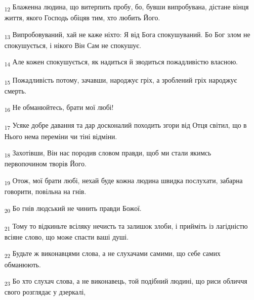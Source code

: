 \begin{tcolorbox}
\textsubscript{12} Блаженна людина, що витерпить пробу, бо, бувши випробувана, дістане вінця життя, якого Господь обіцяв тим, хто любить Його.
\end{tcolorbox}
\begin{tcolorbox}
\textsubscript{13} Випробовуваний, хай не каже ніхто: Я від Бога спокушуваний. Бо Бог злом не спокушується, і нікого Він Сам не спокушує.
\end{tcolorbox}
\begin{tcolorbox}
\textsubscript{14} Але кожен спокушується, як надиться й зводиться пожадливістю власною.
\end{tcolorbox}
\begin{tcolorbox}
\textsubscript{15} Пожадливість потому, зачавши, народжує гріх, а зроблений гріх народжує смерть.
\end{tcolorbox}
\begin{tcolorbox}
\textsubscript{16} Не обманюйтесь, брати мої любі!
\end{tcolorbox}
\begin{tcolorbox}
\textsubscript{17} Усяке добре давання та дар досконалий походить згори від Отця світил, що в Нього нема переміни чи тіні відміни.
\end{tcolorbox}
\begin{tcolorbox}
\textsubscript{18} Захотівши, Він нас породив словом правди, щоб ми стали якимсь первопочином творів Його.
\end{tcolorbox}
\begin{tcolorbox}
\textsubscript{19} Отож, мої брати любі, нехай буде кожна людина швидка послухати, забарна говорити, повільна на гнів.
\end{tcolorbox}
\begin{tcolorbox}
\textsubscript{20} Бо гнів людський не чинить правди Божої.
\end{tcolorbox}
\begin{tcolorbox}
\textsubscript{21} Тому то відкиньте всіляку нечисть та залишок злоби, і прийміть із лагідністю всіяне слово, що може спасти ваші душі.
\end{tcolorbox}
\begin{tcolorbox}
\textsubscript{22} Будьте ж виконавцями слова, а не слухачами самими, що себе самих обманюють.
\end{tcolorbox}
\begin{tcolorbox}
\textsubscript{23} Бо хто слухач слова, а не виконавець, той подібний людині, що риси обличчя свого розглядає у дзеркалі,
\end{tcolorbox}
